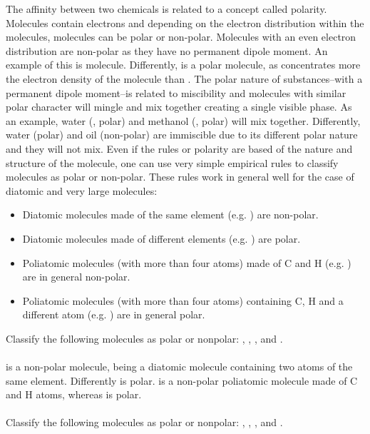 \documentclass[main.tex]{subfiles} %
\begin{document}
\begin{description}
\begin{figure}[h]
\end{figure}%


\item[\docfilehook{Empirical rules of polarity}{Empirical rules of polarity}] The affinity between two chemicals is related to a concept called polarity. Molecules contain electrons and depending on the electron distribution within the molecules, molecules can be polar or non-polar.
Molecules with an even electron distribution are non-polar as they have no permanent dipole moment. An example of this is  molecule. Differently,   is a polar molecule, as  concentrates more the electron density of the molecule than . The polar nature of substances--with a permanent dipole moment--is related to miscibility and molecules with similar polar character will mingle and mix together creating a single visible phase. As an example, water (, polar) and methanol (, polar) will mix together. Differently, water (polar) and oil (non-polar) are immiscible due to its different polar nature and they will not mix. Even if the rules or polarity are based of the nature and structure of the molecule, one can use very simple empirical rules to classify molecules as polar or non-polar. These rules work in general well for the case of diatomic and very large molecules:
\begin{itemize}
   \item  Diatomic molecules made of the same element (e.g. ) are non-polar.
      \item  Diatomic molecules made of different elements (e.g. ) are polar.
   \item Poliatomic molecules (with more than four atoms) made of C and H (e.g. ) are in general non-polar.
   \item Poliatomic molecules (with more than four atoms) containing C, H and a different atom (e.g. ) are in general polar.
 \end{itemize}
\begin{example} %
Classify the following molecules as polar or nonpolar: , , , and .
\\
\\
 is a non-polar molecule, being a diatomic molecule containing two atoms of the same element. Differently  is polar.  is a non-polar poliatomic molecule made of C and H atoms, whereas  is polar.
\\
\faDiamond\ \\
Classify the following molecules as polar or nonpolar: , , , and .
\\
\end{example}%


\end{description}
\end{document}
